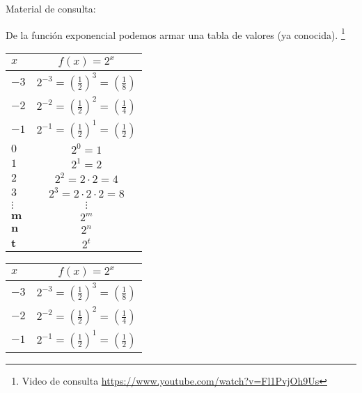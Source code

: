 \documentclass[11pt]{examdesign}
\begin{document}
\begin{fillin}[title={Completar el siguiente cuadro siguiendo el ejemplo del primer renglón:}]
    
    \begin{endmatter}
    	\vspace*{1.5in}
    	\centerline{\Large \textcolor{upforestgreen}{Material de consulta:}}
    	\bigskip
    	De la función exponencial podemos armar una tabla de valores (ya conocida). \footnote{Video de consulta \url{https://www.youtube.com/watch?v=Fl1PvjOh9Us}}
    	\begin{multicols}{2}
    		   
    			\begin{center}
    				\begin{tabular}{|l|c|}
    					\hline
    					$x$ & $f(x)=2^x$       \\ \hline
    					$-3$&$2^{-3}=\left(\frac{1}{2}\right)^3=\left(\frac{1}{8}\right)$\\\hline
    					$-2$&$2^{-2}=\left(\frac{1}{2}\right)^2=\left(\frac{1}{4}\right)$ \\\hline
    					$-1$& $2^{-1}=\left(\frac{1}{2}\right)^1=\left(\frac{1}{2}\right)$\\\hline
    					$0$ & $2^0=1$                   \\\hline
    					$1$          & $2^1=2$           \\\hline
    					$2$          & $2^2=2\cdot2=4$       \\\hline
    					$3$          & $2^3=2\cdot2\cdot2=8$     \\\hline
    					$\vdots$     & $\vdots$          \\\hline
    					$\textbf{m}$ & $2^m$    \\\hline
    				    $\textbf{n}$ & $2^n$    \\\hline
    				    $\textbf{t}$ & $2^t$    \\\hline
    				\end{tabular}
    		\end{center}
    		\columnbreak
    		\begin{center}
    			 \begin{tabular}{|l|c|}
    			 	\hline
    			 	$x$ & $f(x)=2^x$       \\ \hline
    			 	$-3$&$2^{-3}=\left(\frac{1}{2}\right)^3=\left(\frac{1}{8}\right)$\\\hline
    			 	$-2$&$2^{-2}=\left(\frac{1}{2}\right)^2=\left(\frac{1}{4}\right)$ \\\hline
    			 	$-1$& $2^{-1}=\left(\frac{1}{2}\right)^1=\left(\frac{1}{2}\right)$\\\hline

\end{tabular}
\end{center}
\end{multicols}
\end{endmatter}
\end{fillin}
\end{document}
